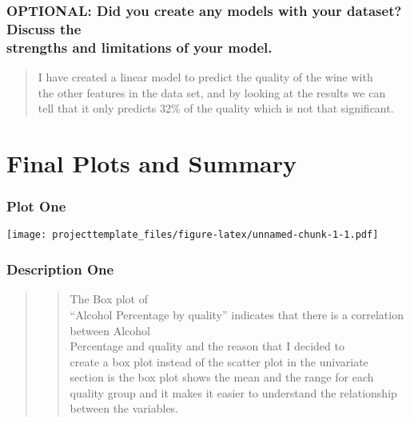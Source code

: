\documentclass[]{article}
\begin{document}
\subsubsection{\texorpdfstring{OPTIONAL: Did you create any models with
your dataset? Discuss the\\
strengths and limitations of your
model.}{OPTIONAL: Did you create any models with your dataset? Discuss the strengths and limitations of your model.}}\label{optional-did-you-create-any-models-with-your-dataset-discuss-the-strengths-and-limitations-of-your-model.}

\begin{quote}
I have created a linear model to predict the quality of the wine with\\
the other features in the data set, and by looking at the results we
can\\
tell that it only predicts 32\% of the quality which is not that
significant.
\end{quote}

\section{Final Plots and Summary}\label{final-plots-and-summary}

\subsubsection{Plot One}\label{plot-one}

\texttt{[image: projecttemplate\_files/figure-latex/unnamed-chunk-1-1.pdf]}

\subsubsection{Description One}\label{description-one}

\begin{quote}
\begin{quote}
The Box plot of\\
``Alcohol Percentage by quality'' indicates that there is a correlation
between Alcohol\\
Percentage and quality and the reason that I decided to\\
create a box plot instead of the scatter plot in the univariate\\
section is the box plot shows the mean and the range for each\\
quality group and it makes it easier to understand the relationship\\
between the variables.
\end{quote}
\end{quote}
\end{document}
